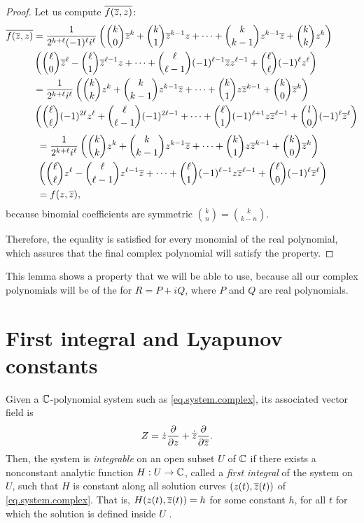 \begin{lemma}
\begin{proof}
Let us compute $\overline{f(\overline{z},z)}$:
\begin{align*}
\overline{f(\overline{z},z)}&=
\frac{1}{2^{k+\ell}(-1)^\ell i^\ell}\left(\binom{k}{0}\overline{z}^k+\binom{k}{1}\overline{z}^{k-1}z+\cdots+\binom{k}{k-1}z^{k-1}\overline{z}+\binom{k}{k}z^k\right)\\
&{}\left(\binom{\ell}{0}\overline{z}^\ell-\binom{\ell}{1}\overline{z}^{\ell-1}z+\cdots+\binom{\ell}{\ell-1}(-1)^{\ell-1}\overline{z} z^{\ell-1}+\binom{\ell}{\ell}(-1)^\ell z^\ell\right)\\
&=\frac{1}{2^{k+\ell}i^\ell}\left(\binom{k}{k}z^k+\binom{k}{k-1}z^{k-1}\overline{z}+\cdots+\binom{k}{1}z\overline{z}^{k-1}+\binom{k}{0}\overline{z}^k\right)\\
&{}\left(\binom{\ell}{\ell}(-1)^{2\ell}z^\ell+\binom{\ell}{\ell-1}(-1)^{2\ell-1}+\cdots+\binom{\ell}{1}(-1)^{\ell+1}z\overline{z}^{\ell-1}+\binom{l}{0}(-1)^\ell\overline{z}^\ell\right)\\
\end{align*}
\begin{align*}
&=
\frac{1}{2^{k+\ell}i^\ell}\left(\binom{k}{k}z^k+\binom{k}{k-1}z^{k-1}\overline{z}+\cdots+\binom{k}{1}z\overline{z}^{k-1}+\binom{k}{0}\overline{z}^k\right)\\
&{}\left(\binom{\ell}{\ell}z^\ell-\binom{\ell}{\ell-1}z^{\ell-1}\overline{z}+\cdots+\binom{\ell}{1}(-1)^{\ell-1}z\overline{z}^{\ell-1}+\binom{\ell}{0}(-1)^\ell\overline{z}^\ell\right)\\
&=f(z,\overline{z}),
\end{align*}
because binomial coefficients are symmetric $\binom{k}{n}=\binom{k}{k-n}$.

Therefore, the equality is satisfied for every monomial of the real polynomial, which assures that the final complex polynomial will satisfy the property.
\end{proof}
\end{lemma}

This lemma shows a property that we will be able to use, because all our complex polynomials will be of the for $R=P+iQ$, where $P$ and $Q$ are real polynomials.




\section{First integral and Lyapunov constants}
\label{sec.firstint}
\begin{definicio}
Given a $\mathbb{C}$-polynomial system such as \eqref{eq.system.complex}, its associated vector field is
\begin{align}
Z&=\dot{z}\frac{\partial{}}{\partial{z}}+ \dot{\overline{z}}\frac{\partial{}}{\partial{\overline{z}}}.
\label{eq.vectorfield.complex}
\end{align}
Then, the system is \emph{integrable} on an open subset $U$ of $\mathbb{C}$ if there exists a nonconstant analytic function $H:U\to\mathbb{C}$, called a \emph{first integral} of the system on $U$, such that $H$ is constant along all solution curves $(z(t),\overline{z}(t))$ of \eqref{eq.system.complex}. That is, $H(z(t),\overline{z}(t))=h$ for some constant $h$, for all $t$ for which the solution is defined inside $U$ \parencite{Dumortier2006}.
\end{definicio}

